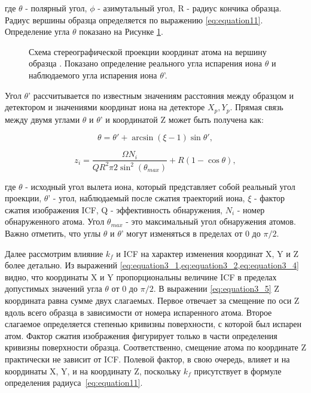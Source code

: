 где $\theta$ - полярный угол, $\phi$ - азимутальный угол, R - радиус кончика образца. Радиус вершины образца определяется по выражению \cref{eq:equation11}.  Определение угла $\theta$ показано на Рисунке \cref{fig:p3_projection}.

\begin{figure}[htb]
	\caption{Схема стереографической проекции координат атома на вершину образца \cite{scbibDensity}. Показано определение реального угла испарения иона $\theta$ и наблюдаемого угла испарения иона $\theta$'.}
	\label{fig:p3_projection}
\end{figure} 

Угол $\theta$' рассчитывается по известным значениям расстояния между образцом и детектором и значениями координат иона на детекторе $X_p, Y_p$. Прямая связь между двумя углами $\theta$ и $\theta$' и координатой Z может быть получена как:

\begin{equation}
	\label{eq:equation3_4}
	\theta = \theta' + \arcsin(\xi - 1)\sin{\theta'},
\end{equation}

\begin{equation}
	\label{eq:equation3_5}
	z_i = \frac{\Omega N_i}{Q R^2 \pi 2 {\sin^2(\theta_{max})}} + R (1- \cos{\theta}),
\end{equation}

где $\theta$ - исходный угол вылета иона, который представляет собой реальный угол проекции, $\theta$' - угол, наблюдаемый после сжатия траекторий иона, $\xi$ - фактор сжатия изображения ICF, Q - эффективность обнаружения, $N_i$ - номер обнаруженного атома. Угол $\theta_{max}$ - это максимальный угол обнаружения атомов. Важно отметить, что углы $\theta$ и $\theta$' могут изменяться в пределах от 0 до $\pi/2$.

Далее рассмотрим влияние $k_f$ и ICF на характер изменения координат X, Y и Z более детально. Из выражений \cref{eq:equation3_1,eq:equation3_2,eq:equation3_4} видно, что координаты X и Y  пропорциональны величине ICF в пределах допустимых значений угла $\theta$ от 0 до $\pi/2$. В выражении \cref{eq:equation3_5} Z координата равна сумме двух слагаемых. Первое отвечает за смещение по оси Z вдоль всего образца в зависимости от номера испаренного атома. Второе слагаемое определяется степенью кривизны поверхности, с которой был испарен атом. Фактор сжатия изображения фигурирует только в части определения кривизны поверхности образца. Соответственно, смещение атома по координате Z практически не зависит от ICF. Полевой фактор, в свою очередь, влияет и на координаты X, Y, и на координату Z, поскольку $k_f$ присутствует в формуле определения радиуса~\cref{eq:equation11}.

